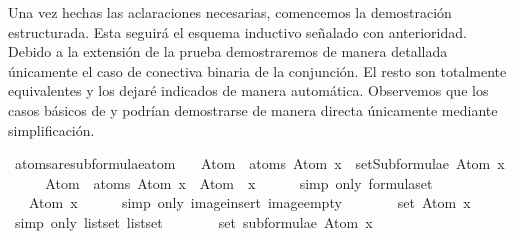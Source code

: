 \begin{isabellebody}
\begin{isamarkuptext}
  Una vez hechas las aclaraciones necesarias, comencemos la demostración estructurada.
  Esta seguirá el esquema inductivo señalado con anterioridad. Debido a la extensión de la prueba
  demostraremos de manera detallada únicamente el caso de conectiva binaria de la conjunción. 
  El resto son totalmente equivalentes y los dejaré indicados
  de manera automática. Observemos que los casos básicos de  y \isa{{\isasymbottom}} 
  podrían demostrarse de manera directa únicamente mediante simplificación.%
\end{isamarkuptext}\isamarkuptrue%
\isamarkupfalse%
\ atoms{\isacharunderscore}are{\isacharunderscore}subformulae{\isacharunderscore}atom{\isacharcolon}\ \isanewline
\ \ {\isachardoublequoteopen}Atom\ {\isacharbackquote}\ atoms\ {\isacharparenleft}Atom\ x{\isacharparenright}\ {\isasymsubseteq}\ setSubformulae\ {\isacharparenleft}Atom\ x{\isacharparenright}{\isachardoublequoteclose}\ \isanewline
%
\isadelimproof
%
\endisadelimproof
%
\isatagproof
{}\isamarkupfalse%
\ {\isacharminus}\isanewline
\ \ \isamarkupfalse%
\ {\isachardoublequoteopen}Atom\ {\isacharbackquote}\ atoms\ {\isacharparenleft}Atom\ x{\isacharparenright}\ {\isacharequal}\ Atom\ {\isacharbackquote}\ {\isacharbraceleft}x{\isacharbraceright}{\isachardoublequoteclose}\isanewline
\ \ \ \ \isamarkupfalse%
\ {\isacharparenleft}simp\ only{\isacharcolon}\ formula{\isachardot}set{\isacharparenleft}{}{\isacharparenright}{\isacharparenright}\isanewline
\ \ \isamarkupfalse%
\ \isamarkupfalse%
\ {\isachardoublequoteopen}{\isasymdots}\ {\isacharequal}\ {\isacharbraceleft}Atom\ x{\isacharbraceright}{\isachardoublequoteclose}\isanewline
\ \ \ \ \isamarkupfalse%
\ {\isacharparenleft}simp\ only{\isacharcolon}\ image{\isacharunderscore}insert\ image{\isacharunderscore}empty{\isacharparenright}\isanewline
\ \ \isamarkupfalse%
\ \isamarkupfalse%
\ {\isachardoublequoteopen}{\isasymdots}\ {\isacharequal}\ set\ {\isacharbrackleft}Atom\ x{\isacharbrackright}{\isachardoublequoteclose}\isanewline
\ \ \ \ \isamarkupfalse%
\ {\isacharparenleft}simp\ only{\isacharcolon}\ list{\isachardot}set{\isacharparenleft}{}{\isacharparenright}\ list{\isachardot}set{\isacharparenleft}{}{\isacharparenright}{\isacharparenright}\isanewline
\ \ \isamarkupfalse%
\ \isamarkupfalse%
\ {\isachardoublequoteopen}{\isasymdots}\ {\isacharequal}\ set\ {\isacharparenleft}subformulae\ {\isacharparenleft}Atom\ x{\isacharparenright}{\isacharparenright}{\isachardoublequoteclose}\isanewline

\end{isabellebody}
